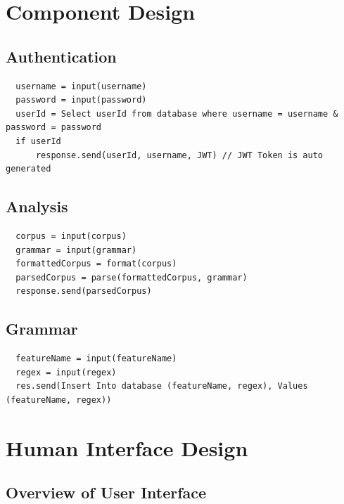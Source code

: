 \documentclass[12pt]{article}
\begin{document}
\section{Component Design}

\subsection{Authentication}
\begin{verbatim}
  username = input(username)
  password = input(password)
  userId = Select userId from database where username = username & password = password
  if userId
      response.send(userId, username, JWT) // JWT Token is auto generated  
\end{verbatim}

\subsection{Analysis}
\begin{verbatim}
  corpus = input(corpus)
  grammar = input(grammar)
  formattedCorpus = format(corpus)
  parsedCorpus = parse(formattedCorpus, grammar)
  response.send(parsedCorpus)
\end{verbatim}

\subsection{Grammar}
\begin{verbatim}
  featureName = input(featureName)
  regex = input(regex)
  res.send(Insert Into database (featureName, regex), Values (featureName, regex))
\end{verbatim}


\section{Human Interface Design}

\subsection {Overview of User Interface}
\end{document}
